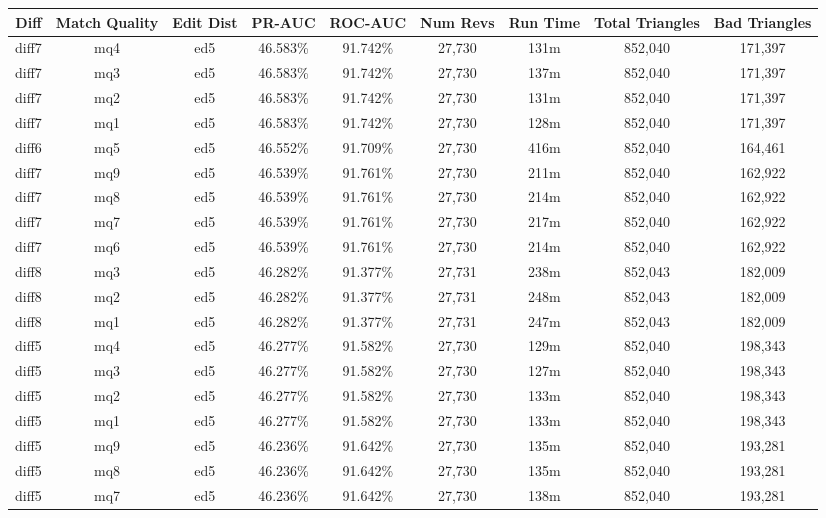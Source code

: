 \begin{sidewaystable}[!ph]
  \begin{center}
    \begin{tabular}{|c|c|c||c|c||c|c|c|c|}
\hline
Diff & Match Quality & Edit Dist
        & PR-AUC & ROC-AUC
        & Num Revs & Run Time
        & Total Triangles & Bad Triangles \\
\hline
\hline
diff7 & mq4 & ed5 & 46.583\% & 91.742\% & 27,730 & 131m & 852,040 & 171,397 \\
diff7 & mq3 & ed5 & 46.583\% & 91.742\% & 27,730 & 137m & 852,040 & 171,397 \\
diff7 & mq2 & ed5 & 46.583\% & 91.742\% & 27,730 & 131m & 852,040 & 171,397 \\
diff7 & mq1 & ed5 & 46.583\% & 91.742\% & 27,730 & 128m & 852,040 & 171,397 \\
diff6 & mq5 & ed5 & 46.552\% & 91.709\% & 27,730 & 416m & 852,040 & 164,461 \\
diff7 & mq9 & ed5 & 46.539\% & 91.761\% & 27,730 & 211m & 852,040 & 162,922 \\
diff7 & mq8 & ed5 & 46.539\% & 91.761\% & 27,730 & 214m & 852,040 & 162,922 \\
diff7 & mq7 & ed5 & 46.539\% & 91.761\% & 27,730 & 217m & 852,040 & 162,922 \\
diff7 & mq6 & ed5 & 46.539\% & 91.761\% & 27,730 & 214m & 852,040 & 162,922 \\
diff8 & mq3 & ed5 & 46.282\% & 91.377\% & 27,731 & 238m & 852,043 & 182,009 \\
diff8 & mq2 & ed5 & 46.282\% & 91.377\% & 27,731 & 248m & 852,043 & 182,009 \\
diff8 & mq1 & ed5 & 46.282\% & 91.377\% & 27,731 & 247m & 852,043 & 182,009 \\
diff5 & mq4 & ed5 & 46.277\% & 91.582\% & 27,730 & 129m & 852,040 & 198,343 \\
diff5 & mq3 & ed5 & 46.277\% & 91.582\% & 27,730 & 127m & 852,040 & 198,343 \\
diff5 & mq2 & ed5 & 46.277\% & 91.582\% & 27,730 & 133m & 852,040 & 198,343 \\
diff5 & mq1 & ed5 & 46.277\% & 91.582\% & 27,730 & 133m & 852,040 & 198,343 \\
diff5 & mq9 & ed5 & 46.236\% & 91.642\% & 27,730 & 135m & 852,040 & 193,281 \\
diff5 & mq8 & ed5 & 46.236\% & 91.642\% & 27,730 & 135m & 852,040 & 193,281 \\
diff5 & mq7 & ed5 & 46.236\% & 91.642\% & 27,730 & 138m & 852,040 & 193,281 \\

\end{tabular}
\end{center}
\end{sidewaystable}
